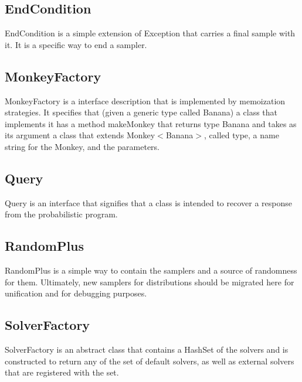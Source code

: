 \subsection{EndCondition}
EndCondition is a simple extension of Exception that carries a final sample with it. It is a specific way to end a sampler.

\subsection{MonkeyFactory}
MonkeyFactory is a interface description that is implemented by memoization strategies. It specifies that (given a generic type called Banana) a class that implements it has a method makeMonkey that returns type Banana and takes as its argument a class that extends Monkey$<$Banana$>$, called type, a name string for the Monkey, and the parameters.

\subsection{Query}
Query is an interface that signifies that a class is intended to recover a response from the probabilistic program.

\subsection{RandomPlus}
RandomPlus is a simple way to contain the samplers and a source of randomness for them. Ultimately, new samplers for distributions should be migrated here for unification and for debugging purposes. 

\subsection{SolverFactory}
SolverFactory is an abstract class that contains a HashSet of the solvers and is constructed to return any of the set of default solvers, as well as external solvers that are registered with the set.





